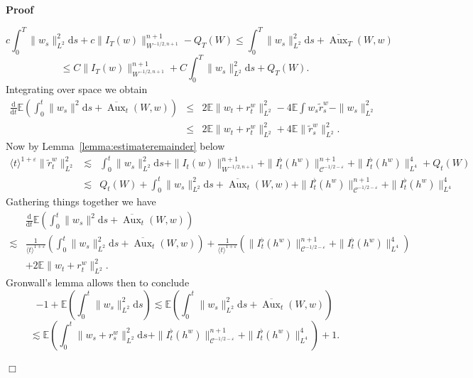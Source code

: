 \documentclass[11pt]{article}
\newcommand{\mathd}{\mathrm{d}}
\newcommand{\tmop}[1]{\ensuremath{\operatorname{#1}}}
\newenvironment{proof}{\noindent\textbf{Proof\ }}{\hspace*{\fill}$\Box$\medskip}
\newcommand{\VV}{\mathscr{C}}
\begin{document}
\begin{proof}
  
  \[ c \int^T_0 \| w_s \|_{L^2}^2 \mathd s + c \| I_T (w) \|^{n + 1}_{W^{- 1 /
     2, n + 1}} - Q_T (W) \leqslant \int^T_0 \| w_s \|_{L^2}^2 \mathd s +
     \overline{\tmop{Aux}}_T (W, w) \]
  \[ \leqslant C \| I_T (w) \|^{n + 1}_{W^{- 1 / 2, n + 1}} + C \int^T_0 \|
     w_s \|_{L^2}^2 \mathd s + Q_T (W) . \]
  Integrating over space we obtain
  \begin{eqnarray*}
    \frac{\mathd}{\mathd t} \mathbb{E} \left( \int^t_0 \| w_s \|^2 \mathd s +
    \overline{\tmop{Aux}}_t (W, w) \right) & \leqslant & 2\mathbb{E} \| w_t +
    r_t^w \|_{L^2}^2 - 4\mathbb{E} \int w_s \tilde{r}_s^w - \| w_s
    \|_{L^2}^2\\
    & \leqslant & 2\mathbb{E} \| w_t + r_t^w \|_{L^2}^2 + 4\mathbb{E} \|
    \tilde{r}_s^w \|_{L^2}^2 .
  \end{eqnarray*}
  Now by Lemma~\ref{lemma:estimateremainder} below
  \[ \begin{array}{lll}
       \langle t \rangle^{1 + \varepsilon} \| \tilde{r}_t^w \|_{L^2}^2 &
       \lesssim & \int^t_0 \| w_s \|_{L^2}^2 \mathd s + \| I_t (w) \|^{n +
       1}_{W^{- 1 / 2, n + 1}} + \| I_t^{\flat} (h^w) \|^{n + 1}_{\VV^{- 1 / 2
       - \varepsilon}} + \| I^{\flat}_t (h^w) \|^4_{L^4} + Q_t (W)\\
       & \lesssim & Q_t (W) + \int^t_0 \| w_s \|_{L^2}^2 \mathd s +
       \overline{\tmop{Aux}}_t (W, w) + \| I_t^{\flat} (h^w) \|^{n +
       1}_{\VV^{- 1 / 2 - \varepsilon}} + \| I^{\flat}_t (h^w) \|^4_{L^4}
     \end{array} \]
  Gathering things together we have
  \[ \begin{array}{ll}
       & \frac{\mathd}{\mathd t} \mathbb{E} \left( \int^t_0 \| w_s \|^2
       \mathd s + \overline{\tmop{Aux}}_t (W, w) \right)\\
       \lesssim & \frac{1}{\langle t \rangle^{1 + \varepsilon}} \left(
       \int^t_0 \| w_s \|_{L^2}^2 \mathd s + \overline{\tmop{Aux}}_t (W, w)
       \right) + \frac{1}{\langle t \rangle^{1 + \varepsilon}} \left( \|
       I_t^{\flat} (h^w) \|^{n + 1}_{\VV^{- 1 / 2 - \varepsilon}} + \|
       I^{\flat}_t (h^w) \|^4_{L^4} \right)\\
       & + 2\mathbb{E} \| w_t + r_t^w \|_{L^2}^2 .
     \end{array} \]
  Gronwall's lemma allows then to conclude
  \[ - 1 +\mathbb{E} \left( \int^t_0 \| w_s \|_{L^2}^2 \mathd s \right)
     \lesssim \mathbb{E} \left( \int^t_0 \| w_s \|_{L^2}^2 \mathd s +
     \overline{\tmop{Aux}}_t (W, w) \right) \]
  \[ \lesssim \mathbb{E} \left( \int^t_0 \| w_s + r_s^w \|_{L^2}^2 \mathd s +
     \| I_t^{\flat} (h^w) \|^{n + 1}_{\VV^{- 1 / 2 - \varepsilon}} + \|
     I^{\flat}_t (h^w) \|^4_{L^4} \right) + 1. \]
  
\end{proof}
\end{document}
